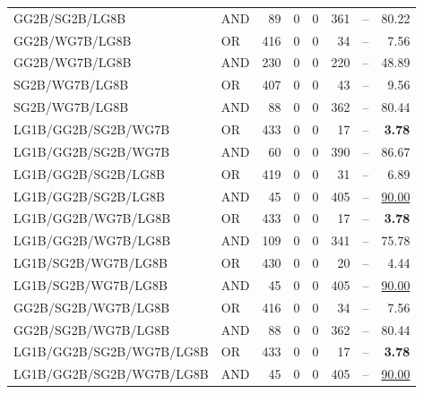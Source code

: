\documentclass{article}
\begin{document}
{\begin{longtable}{llrrrrrr}
 GG2B/SG2B/LG8B           & AND     &   89 &    0 &    0 &  361 & --    & 80.22             \\
 GG2B/WG7B/LG8B           & OR      &  416 &    0 &    0 &   34 & --    & 7.56              \\
 GG2B/WG7B/LG8B           & AND     &  230 &    0 &    0 &  220 & --    & 48.89             \\
 SG2B/WG7B/LG8B           & OR      &  407 &    0 &    0 &   43 & --    & 9.56              \\
 SG2B/WG7B/LG8B           & AND     &   88 &    0 &    0 &  362 & --    & 80.44             \\
 LG1B/GG2B/SG2B/WG7B      & OR      &  433 &    0 &    0 &   17 & --    & \textbf{3.78}     \\
 LG1B/GG2B/SG2B/WG7B      & AND     &   60 &    0 &    0 &  390 & --    & 86.67             \\
 LG1B/GG2B/SG2B/LG8B      & OR      &  419 &    0 &    0 &   31 & --    & 6.89              \\
 LG1B/GG2B/SG2B/LG8B      & AND     &   45 &    0 &    0 &  405 & --    & \underline{90.00} \\
 LG1B/GG2B/WG7B/LG8B      & OR      &  433 &    0 &    0 &   17 & --    & \textbf{3.78}     \\
 LG1B/GG2B/WG7B/LG8B      & AND     &  109 &    0 &    0 &  341 & --    & 75.78             \\
 LG1B/SG2B/WG7B/LG8B      & OR      &  430 &    0 &    0 &   20 & --    & 4.44              \\
 LG1B/SG2B/WG7B/LG8B      & AND     &   45 &    0 &    0 &  405 & --    & \underline{90.00} \\
 GG2B/SG2B/WG7B/LG8B      & OR      &  416 &    0 &    0 &   34 & --    & 7.56              \\
 GG2B/SG2B/WG7B/LG8B      & AND     &   88 &    0 &    0 &  362 & --    & 80.44             \\
 LG1B/GG2B/SG2B/WG7B/LG8B & OR      &  433 &    0 &    0 &   17 & --    & \textbf{3.78}     \\
 LG1B/GG2B/SG2B/WG7B/LG8B & AND     &   45 &    0 &    0 &  405 & --    & \underline{90.00} \\

\end{longtable}
}

\end{document}
